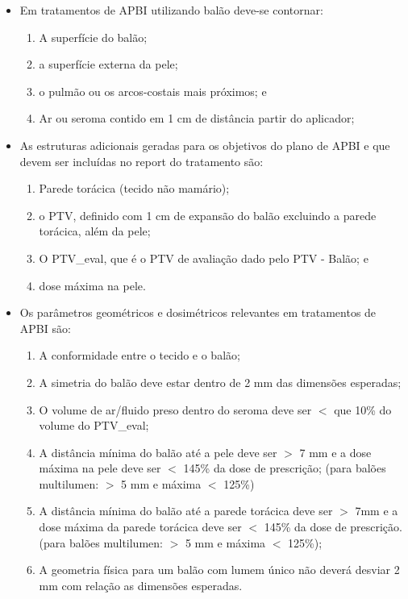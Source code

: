 \documentclass[11pt,a4paper]{article}
\newcounter{exemplo}
\begin{document}
\begin{exemplo}[Braquiterapia]
\begin{itemize}
        \item Em tratamentos de APBI utilizando balão deve-se contornar:
        
            \begin{enumerate}[label=\roman*.]
                \item A superfície do balão;
                \item a superfície externa da pele;
                \item o pulmão ou os arcos-costais mais próximos; e
                \item Ar ou seroma contido em 1 cm de distância partir do aplicador;
            \end{enumerate}
        
        \item As estruturas adicionais geradas para os objetivos do plano de APBI e que devem ser incluídas no report do tratamento são: 
        
            \begin{enumerate}[label=\roman*.]
                \item Parede torácica (tecido não mamário);
                \item o PTV, definido com 1 cm de expansão do balão excluindo a parede torácica, além da pele;
                \item O PTV\_eval, que é o PTV de avaliação dado pelo PTV - Balão; e
                \item dose máxima na pele.
            \end{enumerate}
        
        \item Os parâmetros geométricos e dosimétricos relevantes em tratamentos de APBI são:
        
            \begin{enumerate}[label=\roman*.]
                \item A conformidade entre o tecido e o balão;
                \item A simetria do balão deve estar dentro de 2 mm das dimensões esperadas;
                \item O volume de ar/fluido preso dentro do seroma deve ser $<$ que 10\% do volume do PTV\_eval;
                \item A distância mínima do balão até a pele deve ser $>$ 7 mm e a dose máxima na pele deve ser $<$ 145\% da dose de prescrição; (para balões multilumen: $>$ 5 mm e máxima $<$ 125\%) 
                \item A distância mínima do balão até a parede torácica deve ser $>$ 7mm e a dose máxima da parede torácica deve ser $<$ 145\% da dose de prescrição. (para balões multilumen: $>$ 5 mm e máxima $<$ 125\%);
                \item A geometria física para um balão com lumem único não deverá desviar 2 mm com relação as dimensões esperadas.
            \end{enumerate}


\end{itemize}
\end{exemplo}
\end{document}
